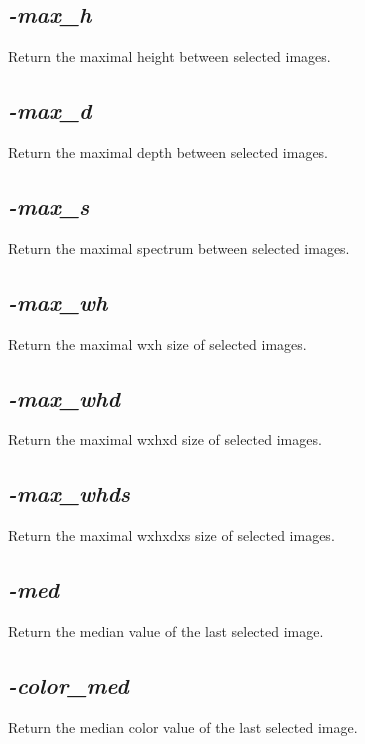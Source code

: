 \documentclass[a4paper,11pt,twoside]{book}
\begin{document}
\subsection{\emph{-max\_h} }\vspace*{-0.5em}
Return the maximal height between selected images.


\subsection{\emph{-max\_d} }\vspace*{-0.5em}
Return the maximal depth between selected images.


\subsection{\emph{-max\_s} }\vspace*{-0.5em}
Return the maximal spectrum between selected images.


\subsection{\emph{-max\_wh} }\vspace*{-0.5em}
Return the maximal wxh size of selected images.


\subsection{\emph{-max\_whd} }\vspace*{-0.5em}
Return the maximal wxhxd size of selected images.


\subsection{\emph{-max\_whds} }\vspace*{-0.5em}
Return the maximal wxhxdxs size of selected images.


\subsection{\emph{-med} }\vspace*{-0.5em}
Return the median value of the last selected image.


\subsection{\emph{-color\_med} }\vspace*{-0.5em}
Return the median color value of the last selected image.
\end{document}
